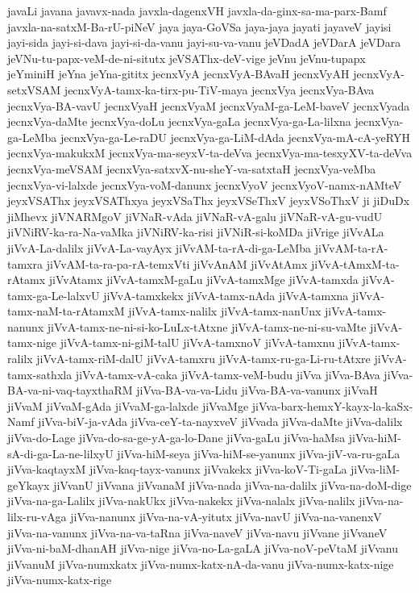 {javaLi
javana
javavx-nada
javxla-dagenxVH
javxla-da-ginx-sa-ma-parx-Bamf
javxla-na-satxM-Ba-rU-piNeV
jaya
jaya-GoVSa
jaya-jaya
jayati
jayaveV
jayisi
jayi-sida
jayi-si-dava
jayi-si-da-vanu
jayi-su-va-vanu
jeVDadA
jeVDarA
jeVDara
jeVNu-tu-papx-veM-de-ni-situtx
jeVSAThx-deV-vige
jeVnu
jeVnu-tupapx
jeYminiH
jeYna
jeYna-gititx
jecnxVyA
jecnxVyA-BAvaH
jecnxVyAH
jecnxVyA-setxVSAM
jecnxVyA-tamx-ka-tirx-pu-TiV-maya
jecnxVya
jecnxVya-BAva
jecnxVya-BA-vavU
jecnxVyaH
jecnxVyaM
jecnxVyaM-ga-LeM-baveV
jecnxVyada
jecnxVya-daMte
jecnxVya-doLu
jecnxVya-gaLa
jecnxVya-ga-La-lilxna
jecnxVya-ga-LeMba
jecnxVya-ga-Le-raDU
jecnxVya-ga-LiM-dAda
jecnxVya-mA-cA-yeRYH
jecnxVya-makukxM
jecnxVya-ma-seyxV-ta-deVva
jecnxVya-ma-tesxyXV-ta-deVva
jecnxVya-meVSAM
jecnxVya-satxvX-nu-sheY-va-satxtaH
jecnxVya-veMba
jecnxVya-vi-lalxde
jecnxVya-voM-danunx
jecnxVyoV
jecnxVyoV-namx-nAMteV
jeyxVSAThx
jeyxVSAThxya
jeyxVSaThx
jeyxVSeThxV
jeyxVSoThxV
ji
jiDuDx
jiMhevx
jiVNARMgoV
jiVNaR-vAda
jiVNaR-vA-galu
jiVNaR-vA-gu-vudU
jiVNiRV-ka-ra-Na-vaMka
jiVNiRV-ka-risi
jiVNiR-si-koMDa
jiVrige
jiVvALa
jiVvA-La-dalilx
jiVvA-La-vayAyx
jiVvAM-ta-rA-di-ga-LeMba
jiVvAM-ta-rA-tamxra
jiVvAM-ta-ra-pa-rA-temxVti
jiVvAnAM
jiVvAtAmx
jiVvA-tAmxM-ta-rAtamx
jiVvAtamx
jiVvA-tamxM-gaLu
jiVvA-tamxMge
jiVvA-tamxda
jiVvA-tamx-ga-Le-lalxvU
jiVvA-tamxkekx
jiVvA-tamx-nAda
jiVvA-tamxna
jiVvA-tamx-naM-ta-rAtamxM
jiVvA-tamx-nalilx
jiVvA-tamx-nanUnx
jiVvA-tamx-nanunx
jiVvA-tamx-ne-ni-si-ko-LuLx-tAtxne
jiVvA-tamx-ne-ni-su-vaMte
jiVvA-tamx-nige
jiVvA-tamx-ni-giM-talU
jiVvA-tamxnoV
jiVvA-tamxnu
jiVvA-tamx-ralilx
jiVvA-tamx-riM-dalU
jiVvA-tamxru
jiVvA-tamx-ru-ga-Li-ru-tAtxre
jiVvA-tamx-sathxla
jiVvA-tamx-vA-caka
jiVvA-tamx-veM-budu
jiVva
jiVva-BAva
jiVva-BA-va-ni-vaq-tayxthaRM
jiVva-BA-va-va-Lidu
jiVva-BA-va-vanunx
jiVvaH
jiVvaM
jiVvaM-gAda
jiVvaM-ga-lalxde
jiVvaMge
jiVva-barx-hemxY-kayx-la-kaSx-Namf
jiVva-biV-ja-vAda
jiVva-ceY-ta-nayxveV
jiVvada
jiVva-daMte
jiVva-dalilx
jiVva-do-Lage
jiVva-do-sa-ge-yA-ga-lo-Dane
jiVva-gaLu
jiVva-haMsa
jiVva-hiM-sA-di-ga-La-ne-lilxyU
jiVva-hiM-seya
jiVva-hiM-se-yanunx
jiVva-jiV-va-ru-gaLa
jiVva-kaqtayxM
jiVva-kaq-tayx-vanunx
jiVvakekx
jiVva-koV-Ti-gaLa
jiVva-liM-geYkayx
jiVvanU
jiVvana
jiVvanaM
jiVva-nada
jiVva-na-dalilx
jiVva-na-doM-dige
jiVva-na-ga-Lalilx
jiVva-nakUkx
jiVva-nakekx
jiVva-nalalx
jiVva-nalilx
jiVva-na-lilx-ru-vAga
jiVva-nanunx
jiVva-na-vA-yitutx
jiVva-navU
jiVva-na-vanenxV
jiVva-na-vanunx
jiVva-na-va-taRna
jiVva-naveV
jiVva-navu
jiVvane
jiVvaneV
jiVva-ni-baM-dhanAH
jiVva-nige
jiVva-no-La-gaLA
jiVva-noV-peVtaM
jiVvanu
jiVvanuM
jiVva-numxkatx
jiVva-numx-katx-nA-da-vanu
jiVva-numx-katx-nige
jiVva-numx-katx-rige
}
